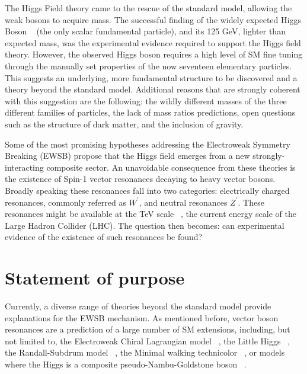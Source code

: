 \documentclass[10pt]{article}
\begin{document}
The Higgs Field theory came to the rescue of the standard model, allowing the weak bosons to acquire mass. The successful finding of the widely expected Higgs Boson ~\cite{higgsPaperCMS,higgsPaperATLAS} (the only scalar fundamental particle), and its 125 GeV, lighter than expected mass, was the experimental evidence required to support the Higgs field theory. However, the observed Higgs boson requires a high level of SM fine tuning through the manually set properties of the now seventeen elementary particles. This suggests an underlying, more fundamental structure to be discovered and a theory beyond the standard model. Additional reasons that are strongly coherent with this suggestion are the following: the wildly different masses of the three different families of particles, the lack of mass ratios predictions, open questions such as the structure of dark matter, and the inclusion of gravity. 

Some of the most promising hypotheses addressing the Electroweak Symmetry Breaking (EWSB) propose that the Higgs field emerges from a new strongly-interacting composite sector. An unavoidable consequence from these theories is the existence of Spin-1 vector resonances decaying to heavy vector bosons. Broadly speaking these resonances fall into two categories: electrically charged resonances, commonly referred as $W^{\prime}$, and neutral resonances $Z^{\prime}$. These resonances might be available at the TeV scale ~\cite{tevscale2014}, the current energy scale of the Large Hadron Collider (LHC). The question then becomes: can experimental evidence of the existence of such resonances be found? 

\section{Statement of purpose}

Currently, a diverse range of theories beyond the standard model provide explanations for the EWSB mechanism. As mentioned before, vector boson resonances are a prediction of a large number of SM extensions, including, but not limited to, the Electroweak Chiral Lagrangian model  ~\cite{echl2017}, the Little Higgs ~\cite{littlehiggs2007}, the Randall-Subdrum model ~\cite{randall1999}, the Minimal walking technicolor ~\cite{technicolor2007}, or models where the Higgs is a composite pseudo-Nambu-Goldstone boson ~\cite{composite2016}. 
\end{document}

